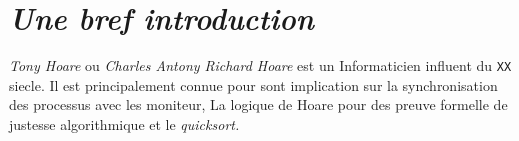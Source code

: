 \documentclass[French,Hoar.tex]{subfiles}
\begin{document}
  \section*{\emph{Une bref introduction}}
  \emph{Tony Hoare} ou \emph{Charles Antony Richard Hoare} est un Informaticien influent du \texttt{XX} siecle.
  Il est principalement connue pour sont implication sur la synchronisation des processus avec les moniteur,
  La logique de Hoare pour des preuve formelle de justesse algorithmique et le \em{quicksort.}
\end{document}
